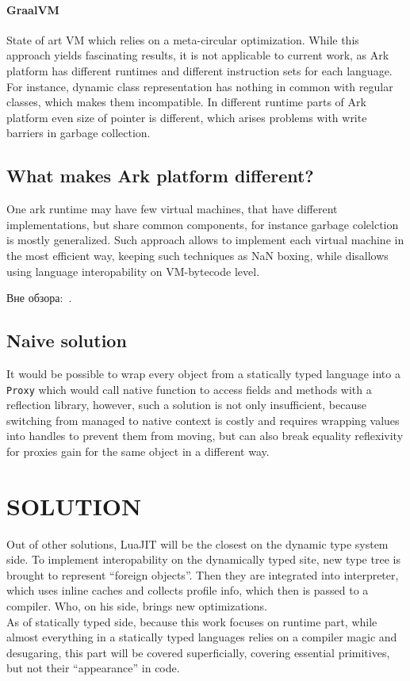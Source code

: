 \documentclass[times,specification,annotation]{itmo-student-thesis}
\begin{document}
\subsubsection{GraalVM}
State of art VM which relies on a meta-circular optimization. While this approach yields fascinating results, it is not applicable to current work, as Ark platform has different runtimes and different instruction sets for each language. For instance, dynamic class representation has nothing in common with regular classes, which makes them incompatible. In different runtime parts of Ark platform even size of pointer is different, which arises problems with write barriers in garbage collection.

\finishrelatedwork

\section{What makes Ark platform different?}
One ark runtime may have few virtual machines, that have different implementations, but share common components, for instance garbage colelction is mostly generalized. Such approach allows to implement each virtual machine in the most efficient way, keeping such techniques as NaN boxing, while disallows using language interopability on VM-bytecode level.

Вне обзора:~\cite{bellman}.

\section{Naive solution}
It would be possible to wrap every object from a statically typed language into a \texttt{Proxy} which would call native function to access fields and methods with a reflection library, however, such a solution is not only insufficient, because switching from managed to native context is costly and requires wrapping values into handles to prevent them from moving, but can also break equality reflexivity for proxies gain for the same object in a different way.

\chapter{SOLUTION}

Out of other solutions, LuaJIT will be the closest on the dynamic type system side. To implement interopability on the dynamically typed site, new type tree is brought to represent ``foreign objects''. Then they are integrated into interpreter, which uses inline caches and collects profile info, which then is passed to a compiler. Who, on his side, brings new optimizations.\\
As of statically typed side, because this work focuses on runtime part, while almost everything in a statically typed languages relies on a compiler magic and desugaring, this part will be covered superficially, covering essential primitives, but not their ``appearance'' in code.
\end{document}
